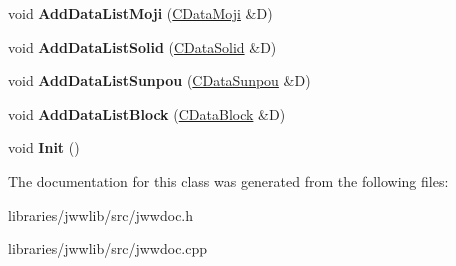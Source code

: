 \begin{DoxyCompactItemize}
\item 
\hypertarget{classJWWBlockList_a01b8f515101f31d1dd5badb2fff6aa49}{void {\bfseries Add\-Data\-List\-Moji} (\hyperlink{classCDataMoji}{C\-Data\-Moji} \&D)}\label{classJWWBlockList_a01b8f515101f31d1dd5badb2fff6aa49}

\item 
\hypertarget{classJWWBlockList_a407e84bdce6bcad74734383e25a914c9}{void {\bfseries Add\-Data\-List\-Solid} (\hyperlink{classCDataSolid}{C\-Data\-Solid} \&D)}\label{classJWWBlockList_a407e84bdce6bcad74734383e25a914c9}

\item 
\hypertarget{classJWWBlockList_a1223995345ec9bdc5f2f97d1488d949e}{void {\bfseries Add\-Data\-List\-Sunpou} (\hyperlink{classCDataSunpou}{C\-Data\-Sunpou} \&D)}\label{classJWWBlockList_a1223995345ec9bdc5f2f97d1488d949e}

\item 
\hypertarget{classJWWBlockList_a30e2061afe79bdf71a4a7df49522a45e}{void {\bfseries Add\-Data\-List\-Block} (\hyperlink{classCDataBlock}{C\-Data\-Block} \&D)}\label{classJWWBlockList_a30e2061afe79bdf71a4a7df49522a45e}

\item 
\hypertarget{classJWWBlockList_aaa9ec90fb225a5fc84c4351ee5be5fb4}{void {\bfseries Init} ()}\label{classJWWBlockList_aaa9ec90fb225a5fc84c4351ee5be5fb4}

\end{DoxyCompactItemize}


The documentation for this class was generated from the following files\-:\begin{DoxyCompactItemize}
\item 
libraries/jwwlib/src/jwwdoc.\-h\item 
libraries/jwwlib/src/jwwdoc.\-cpp\end{DoxyCompactItemize}

